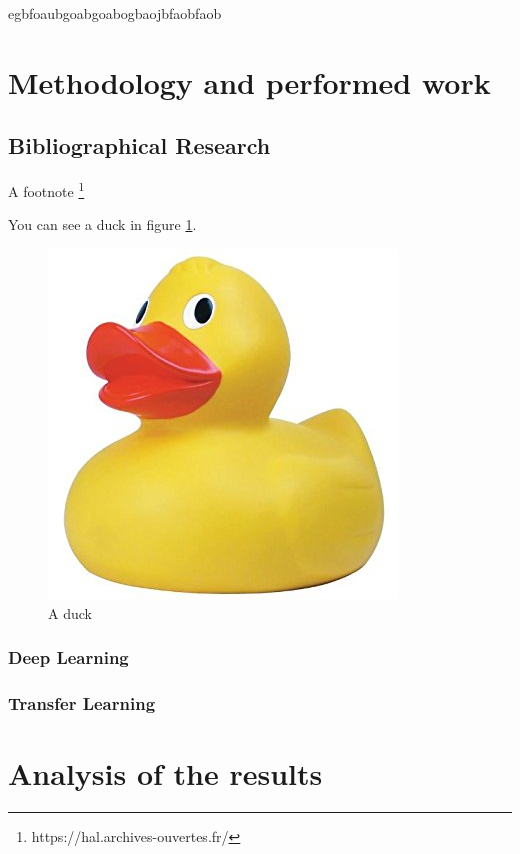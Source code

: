 \documentclass[11pt]{article}
\begin{document}
egbfoaubgoabgoabogbaojbfaobfaob

\cleardoublepage


\section{Methodology and performed work}

 	  
\subsection{Bibliographical Research}
A footnote \footnote{https://hal.archives-ouvertes.fr/}

You can see a duck in figure \ref{fig:duck}.

\begin{figure}[!h]
\centering
\includegraphics[scale=0.3]{bidon.jpg}
\caption{A duck}
\label{fig:duck}
\end{figure}


\subsubsection{Deep Learning} \label{Deep}

	
\subsubsection{Transfer Learning}

\cleardoublepage


\section{Analysis of the results}
\end{document}
